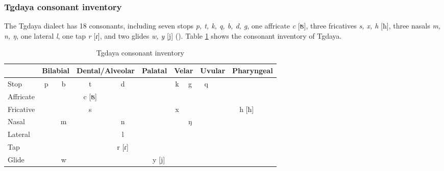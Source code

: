 \documentclass[12pt]{article}
\newcommand{\stgf}{Tgdaya\xspace}
\begin{document}
\subsubsection{Tgdaya consonant inventory} \label{sectgC}

The \stgf dialect has 18 consonants, including seven stops \textit{p, t, k, q, b, d, g}, one affricate \textit{c} [ʦ], three fricatives \textit{s, x, h} [ħ], three nasals \textit{m, n, ŋ}, one lateral \textit{l}, one tap \textit{r} [ɾ], and two glides \textit{w, y} [j] (\cite{Sung2018Sedgrammar}). Table \ref{tab:tgC} shows the consonant inventory of \stgf.

\begin{table}[!htbp]
\centering
\caption{Tgdaya consonant inventory\\}
\label{tab:tgC}
\begin{tabular}{l|cc|cc|cc|cc|cc|cc}
\hline
                    & \multicolumn{2}{c|}{Bilabial} & \multicolumn{2}{c|}{Dental/Alveolar} & \multicolumn{2}{c|}{Palatal} & \multicolumn{2}{c|}{Velar} & \multicolumn{2}{c|}{Uvular} & \multicolumn{2}{c}{Pharyngeal} \\ \hline
Stop                & p            & b           & t               & d               &             &               & k          & g          & q            &            &                 &              \\
Affricate           &               &              & c [ʦ]              &                  &             &               &             &             &               &            &                 &              \\
Fricative           &               &              & s               &                  &             &               & x          &             &               &            & h [ħ]             &              \\
Nasal               &               & m           &                  & n               &             &               &             & ŋ          &               &            &                 &              \\
Lateral &               &              &                  & l               &             &               &             &             &               &            &                 &              \\
Tap                 &               &              &                  & r [ɾ]              &             &               &             &             &               &            &                 &              \\
Glide               &               & w           &                  &                  &             & y [j]           &             &             &               &            &                 &              \\ \hline
\end{tabular}
\end{table}
\end{document}
